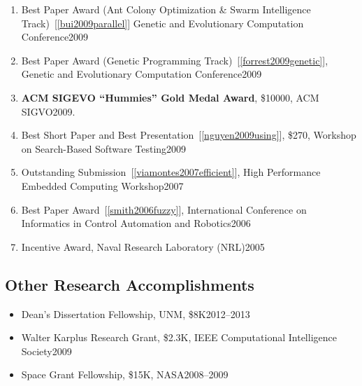 \documentclass[11pt]{article}
\begin{document}
\begin{enumerate}
\item Best Paper Award (Ant Colony Optimization \& Swarm Intelligence Track)~[\ref{bui2009parallel}] Genetic and Evolutionary Computation Conference\hfill 2009
\item Best Paper Award (Genetic Programming Track)~[\ref{forrest2009genetic}], Genetic and Evolutionary Computation Conference\hfill 2009
\item \textbf{ACM SIGEVO “Hummies” Gold Medal Award}, \$10000, ACM SIGVO\hfill 2009.
\item Best Short Paper and Best Presentation~[\ref{nguyen2009using}], \$270, Workshop on Search-Based Software Testing\hfill 2009
\item Outstanding Submission~[\ref{viamontes2007efficient}], High Performance Embedded Computing Workshop\hfill 2007
\item  Best Paper Award~[\ref{smith2006fuzzy}],  International Conference on Informatics in Control Automation and Robotics\hfill 2006
\item Incentive Award,  Naval Research Laboratory (NRL)\hfill 2005
\end{enumerate}

\subsection{Other Research Accomplishments}
\begin{itemize}
\item Dean's Dissertation Fellowship, UNM, \$8K\hfill 2012--2013
\item Walter Karplus Research Grant, \$2.3K, IEEE Computational Intelligence Society\hfill 2009 
\item Space Grant Fellowship, \$15K, NASA\hfill 2008--2009 
\end{itemize}
\end{document}
